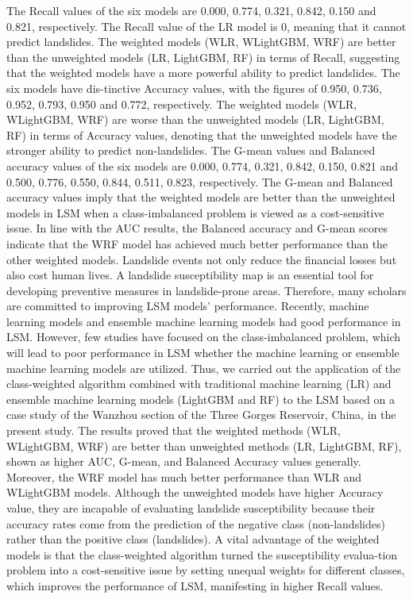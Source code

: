 \documentclass[a4paper,fleqn]{cas-sc}
\begin{document}
The Recall values of the six models are 0.000, 0.774, 0.321, 0.842, 0.150 and 0.821, respectively. 
The Recall value of the LR model is 0, meaning that it cannot predict landslides. 
The weighted models (WLR, WLightGBM, WRF) are better than the unweighted models (LR, LightGBM, RF) in terms of Recall, suggesting that the weighted models have a more powerful ability to predict landslides. 
The six models have dis-tinctive Accuracy values, with the figures of 0.950, 0.736, 0.952, 0.793, 0.950 and 0.772, respectively. The weighted models (WLR, WLightGBM, WRF) are worse than the unweighted models (LR, LightGBM, RF) in terms of Accuracy values, denoting that the unweighted models have the stronger ability to predict non-landslides. 
The G-mean values and Balanced accuracy values of the six models are 0.000, 0.774, 0.321, 0.842, 0.150, 0.821 and 0.500, 0.776, 0.550, 0.844, 0.511, 0.823, respectively. 
The G-mean and Balanced accuracy values imply that the weighted models are better than the unweighted models in LSM when a class-imbalanced problem is viewed as a cost-sensitive issue. 
In line with the AUC results, the Balanced accuracy and G-mean scores indicate that the WRF model has achieved much better performance than the other weighted models.
Landslide events not only reduce the financial losses but also cost human lives. A landslide susceptibility map is an essential tool for developing preventive measures in landslide-prone areas. Therefore, many scholars are committed to improving LSM models' performance. Recently, machine learning models and ensemble machine learning models had good performance in LSM. However, few studies have focused on the class-imbalanced problem, which will lead to poor performance in LSM whether the machine learning or ensemble machine learning models are utilized. Thus, we carried out the application of the class-weighted algorithm combined with traditional machine learning (LR) and ensemble machine learning models (LightGBM and RF) to the LSM based on a case study of the Wanzhou section of the Three Gorges Reservoir, China, in the present study. 
The results proved that the weighted methods (WLR, WLightGBM, WRF) are better than unweighted methods (LR, LightGBM, RF), shown as higher AUC, G-mean, and Balanced Accuracy values generally. Moreover, the WRF model has much better performance than WLR and WLightGBM models. Although the unweighted models have higher Accuracy value, they are incapable of evaluating landslide susceptibility because their accuracy rates come from the prediction of the negative class (non-landslides) rather than the positive class (landslides). A vital advantage of the weighted models is that the class-weighted algorithm turned the susceptibility evalua-tion problem into a cost-sensitive issue by setting unequal weights for different classes, which improves the performance of LSM, manifesting in higher Recall values. 
\end{document}
